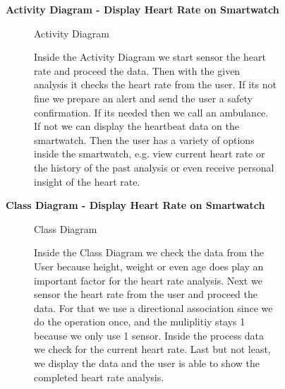 \documentclass{article}
\begin{document}
	\begin{figure}[htbp]
		\textbf{Activity Diagram - Display Heart Rate on Smartwatch}
		\centering
		\begin{subfigure}{\textwidth}
			\resizebox{\textwidth}{!}{}
			\caption{Activity Diagram}
		\end{subfigure}
		\begin{subfigure}{\textwidth}
			Inside the Activity Diagram we start sensor the heart rate and proceed the data. Then with the given analysis it checks the 
			heart rate from the user. If its not fine we prepare an alert and send the user a safety confirmation. If its needed then we call an ambulance. If not 
			we can display the heartbeat data on the smartwatch. Then the user has a variety of options inside the smartwatch, e.g. 
			view current heart rate or the history of the past analysis or even receive personal insight of the heart rate. 
		\end{subfigure}
	\end{figure}

	\clearpage
	\begin{figure}[htbp]
		\textbf{Class Diagram - Display Heart Rate on Smartwatch}
		\centering
		\begin{subfigure}{\textwidth}
			\resizebox{\textwidth}{!}{}
			\caption{Class Diagram}
		\end{subfigure}
		\begin{subfigure}{\textwidth}
			Inside the Class Diagram we check the data from the User because height, weight or even age does play an important factor
			for the heart rate analysis. Next we sensor the heart rate from the user and proceed the data. For that we use a directional 
			association since we do the operation once, and the muliplitiy stays 1 because we only use 1 sensor. Inside the process data we check for 
			the current heart rate. Last but not least, we display the data and the user is able to show the completed heart rate 
			analysis. 
		\end{subfigure}
	\end{figure}
	\clearpage
\end{document}
